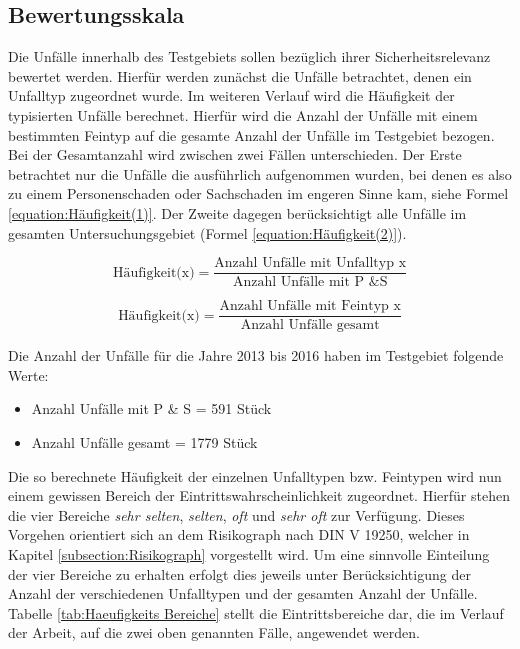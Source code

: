 \subsection{Bewertungsskala}
Die Unfälle innerhalb des Testgebiets sollen bezüglich ihrer Sicherheitsrelevanz bewertet werden. Hierfür werden zunächst die Unfälle betrachtet, denen ein Unfalltyp zugeordnet wurde. Im weiteren Verlauf wird die Häufigkeit der typisierten Unfälle berechnet. Hierfür wird die Anzahl der Unfälle mit einem bestimmten Feintyp auf die gesamte Anzahl der Unfälle im Testgebiet bezogen. Bei der Gesamtanzahl wird zwischen zwei Fällen unterschieden. Der Erste betrachtet nur die Unfälle die ausführlich aufgenommen wurden, bei denen es also zu einem Personenschaden oder Sachschaden im engeren Sinne kam, siehe Formel \ref{equation:Häufigkeit(1)}. Der Zweite dagegen berücksichtigt alle Unfälle im gesamten Untersuchungsgebiet (Formel \ref{equation:Häufigkeit(2)}).

\begin{equation}\label{equation:Häufigkeit(1)}
\text{Häufigkeit(x)} = \dfrac{\text{Anzahl Unfälle mit Unfalltyp x}}{\text{Anzahl Unfälle mit P \& S}}
\end{equation}

\begin{equation}\label{equation:Häufigkeit(2)}
\text{Häufigkeit(x)} = \dfrac{\text{Anzahl Unfälle mit Feintyp x}}{\text{Anzahl Unfälle gesamt}}
\end{equation}

Die Anzahl der Unfälle für die Jahre 2013 bis 2016 haben im Testgebiet folgende Werte:

\begin{itemize}
	\item Anzahl Unfälle mit P \& S = 591 Stück
	\item Anzahl Unfälle gesamt = 1779 Stück
\end{itemize}

Die so berechnete Häufigkeit der einzelnen Unfalltypen bzw. Feintypen wird nun einem gewissen Bereich der Eintrittswahrscheinlichkeit zugeordnet. Hierfür stehen die vier Bereiche \textit{sehr selten}, \textit{selten}, \textit{oft} und \textit{sehr oft} zur Verfügung. Dieses Vorgehen orientiert sich an dem Risikograph nach DIN V 19250, welcher in Kapitel \ref{subsection:Risikograph} vorgestellt wird. Um eine sinnvolle Einteilung der  vier Bereiche zu erhalten erfolgt dies jeweils unter Berücksichtigung der Anzahl der verschiedenen Unfalltypen und der gesamten Anzahl der Unfälle. Tabelle \ref{tab:Haeufigkeits Bereiche} stellt die Eintrittsbereiche dar, die im Verlauf der Arbeit, auf die zwei oben genannten Fälle, angewendet werden.

